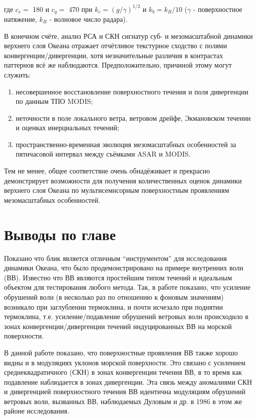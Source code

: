 \noindent где $c_{s} =$ 180 и $c_{q} =$ 470 при $k_{c} =(g/\gamma )^{1/2} $ и $k_{b} =k_{R} /10$ ($\gamma $ - поверхностное натяжение, $k_{R} $ - волновое число радара).

В конечном счёте, анализ РСА и СКН сигнатур суб- и мезомасштабной динамики верхнего слоя Океана отражает отчётливое текстурное сходство с полями конвергенции/дивергенции, хотя незначительные различия в контрастах паттернов всё же наблюдаются. Предположительно, причиной этому могут служить:

\begin{enumerate}
\item  несовершенное восстановление поверхностного течения и поля дивергенции по данным ТПО MODIS;

\item  неточности в поле локального ветра, ветровом дрейфе, Экмановском течении и оценках инерциальных течений;

\item  пространственно-временная эволюция мезомасштабных особенностей за пятичасовой интервал между съёмками ASAR и MODIS.
\end{enumerate}

Тем не менее, общее соответствие очень обнадёживает и прекрасно демонстрирует возможности для получения количественных оценок динамики верхнего слоя Океана по мультисемнсорным поверхностным проявлениям мезомасштабных особенностей.



\newpage


\section{Выводы по главе} \label{sec:3.4}


Показано что блик является отличным ``инструментом'' для исследования динамики Океана, что было продемонстрировано на примере внутренних волн (ВВ). Известно что ВВ являются простейшим типом течений и идеальным объектом для тестирования любого метода. Так, в работе \citep{1986} показано, что усиление обрушений волн (в несколько раз по отношению к фоновым значениям) возникало при заглублении термоклина, и почти исчезало при поднятии термоклина, т.е. усиление/подавление обрушений ветровых волн происходило в зонах конвергенции/дивергенции течений индуцированных ВВ на морской поверхности.

В данной работе показано, что поверхностные проявления ВВ также хорошо видны и в модуляциях уклонов морской поверхности. Это связано с усилением среднеквадратичного (СКН) в зонах конвергенции течения ВВ, в то время как подавление наблюдается в зонах дивергенции. Эта связь между аномалиями СКН и дивергенцией поверхностного течения ВВ идентична модуляциям обрушений ветровых волн, вызванных ВВ, наблюдаемых Дуловым и др. в 1986 \citep{1986} в этом же районе исследования.

